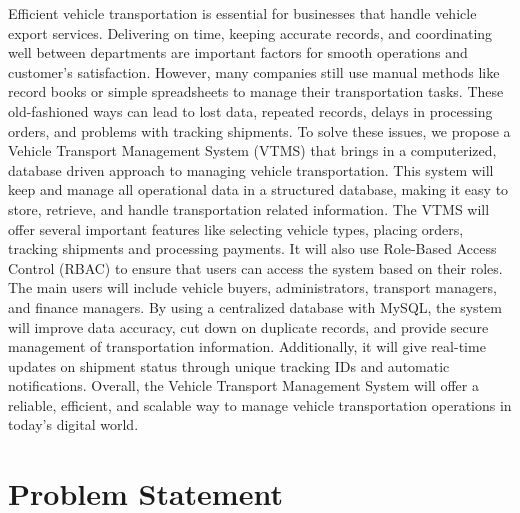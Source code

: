 \documentclass[12pt,a4paper]{article}
\begin{document}
 Efficient vehicle transportation is essential for businesses that handle vehicle export services. Delivering on time, keeping accurate records, and coordinating well between departments are important factors for smooth operations and customer's satisfaction. However, many companies still use manual methods like record books or simple spreadsheets to manage their transportation tasks. These old-fashioned ways can lead to lost data, repeated records, delays in processing orders, and problems with tracking shipments.
To solve these issues, we propose a Vehicle Transport Management System (VTMS) that brings in a computerized, database driven approach to managing vehicle transportation. This system will keep and manage all operational data in a structured database, making it easy to store, retrieve, and handle transportation related information.
The VTMS will offer several important features like selecting vehicle types, placing orders, tracking shipments and processing payments. It will also use Role-Based Access Control (RBAC) to ensure that users can access the system based on their roles. The main users will include vehicle buyers, administrators, transport managers, and finance managers.
By using a centralized database with MySQL, the system will improve data accuracy, cut down on duplicate records, and provide secure management of transportation information. Additionally, it will give real-time updates on shipment status through unique tracking IDs and automatic notifications. Overall, the Vehicle Transport Management System will offer a reliable, efficient, and scalable way to manage vehicle transportation operations in today's digital world.




\section{Problem Statement}
\end{document}
